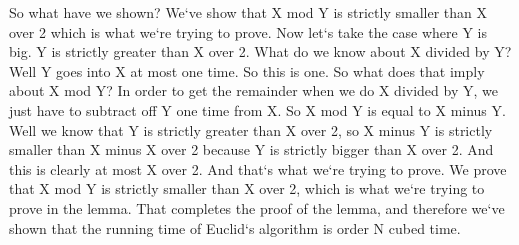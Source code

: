 So what have we shown? We`ve show that X mod Y is strictly smaller than X over 2 which is what we`re trying to prove.
Now let`s take the case where Y is big.
Y is strictly greater than X over 2.
What do we know about X divided by Y? Well Y goes into X at most one time.
So this is one.
So what does that imply about X mod Y? In order to get the remainder when we do X divided by Y, we just have to subtract off Y one time from X\@.
So X mod Y is equal to X minus Y\@.
Well we know that Y is strictly greater than X over 2, so X minus Y is strictly smaller than X minus X over 2 because Y is strictly bigger than X over 2.
And this is clearly at most X over 2.
And that`s what we`re trying to prove.
We prove that X mod Y is strictly smaller than X over 2, which is what we`re trying to prove in the lemma.
That completes the proof of the lemma, and therefore we`ve shown that the running time of Euclid`s algorithm is order N cubed time.

